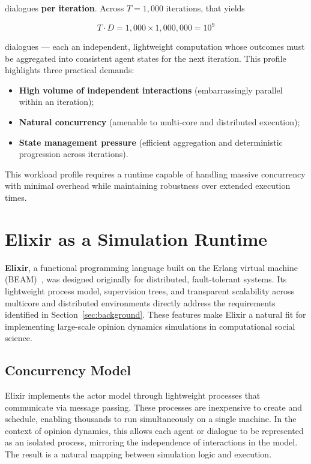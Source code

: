 \documentclass[
]{ceurart}
\begin{document}
dialogues \textbf{per iteration}. Across $T=1{,}000$ iterations, that yields

\[T \cdot D=1{,}000 \times 1{,}000{,}000=10^{9}\]

dialogues --- each an independent, lightweight computation whose outcomes must be aggregated into consistent agent states for the next iteration. This profile highlights three practical demands:
\begin{itemize}
	\item \textbf{High volume of independent interactions} (embarrassingly parallel within an iteration);
	\item \textbf{Natural concurrency} (amenable to multi-core and distributed execution);
	\item \textbf{State management pressure} (efficient aggregation and deterministic progression across iterations).
\end{itemize}

This workload profile requires a runtime capable of handling massive concurrency with minimal overhead while maintaining robustness over extended execution times.

\section{Elixir as a Simulation Runtime}

\textbf{Elixir}, a functional programming language built on the Erlang virtual machine (BEAM)~\cite{Elixir2025}, was designed originally for distributed, fault-tolerant systems. Its lightweight process model, supervision trees, and transparent scalability across multicore and distributed environments directly address the requirements identified in Section~\ref{sec:background}. These features make Elixir a natural fit for implementing large-scale opinion dynamics simulations in computational social science.

\subsection{Concurrency Model}
Elixir implements the actor model through lightweight processes that communicate via message passing. These processes are inexpensive to create and schedule, enabling thousands to run simultaneously on a single machine. In the context of opinion dynamics, this allows each agent or dialogue to be represented as an isolated process, mirroring the independence of interactions in the model. The result is a natural mapping between simulation logic and execution.
\end{document}
